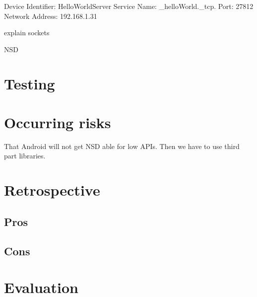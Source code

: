 Device Identifier: HelloWorldServer
Service Name: \_helloWorld.\_tcp.
Port: 27812
Network Address: 192.168.1.31

explain sockets

NSD
\section{Testing}

\section{Occurring risks}

That Android will not get NSD able for low APIs. 
Then we have to use third part libraries.

\section{Retrospective}
\subsection{Pros}
\subsection{Cons}
\section{Evaluation}
